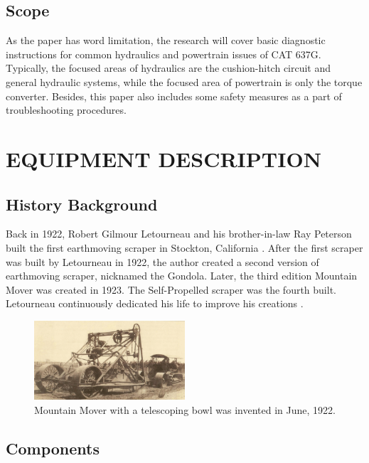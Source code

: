 \documentclass[a4paper,man,natbib]{apa6}
\begin{document}
\subsection{Scope}

As the paper has word limitation, the research will cover basic diagnostic instructions for common hydraulics and powertrain issues of CAT 637G. Typically, the focused areas of hydraulics are the cushion-hitch circuit and general hydraulic systems, while the focused area of powertrain is only the torque converter. Besides, this paper also includes some safety measures as a part of troubleshooting procedures.

\section{EQUIPMENT DESCRIPTION}
\label{sec:examples}

\subsection{History Background}
 
Back in 1922, Robert Gilmour Letourneau and his brother-in-law Ray Peterson built the first earthmoving scraper in Stockton, California \citep[p. 35]{RLMBldng}. After the first scraper was built by Letourneau in 1922, the author created a second version of earthmoving scraper, nicknamed the Gondola. Later, the third edition Mountain Mover was created in 1923. The Self-Propelled scraper was the fourth built. Letourneau continuously dedicated his life to improve his creations \citep{RLMBldng}.

\begin{figure}[!ht]
\centering
\includegraphics[width=0.5\textwidth]{mountain_mover_1922.png}
\centering\caption{\label{fig:rthcr1}Mountain Mover with a telescoping bowl was invented in June, 1922. \citep{RLMBldng}}
\end{figure}

\subsection{Components}
\end{document}
